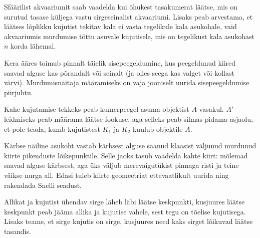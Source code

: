 \documentclass[10pt]{article}
\begin{document}
{
\hint
Sfäärilist akvaariumit saab vaadelda kui õhukest tasakumerat läätse, mis on surutud tasase küljega vastu sirgeseinalist akvaariumi. Lisaks peab arvestama, et läätses lõplikku kujutist tekitav kala ei vasta tegelikule kala asukohale, vaid akvaariumis murdumise tõttu asuvale kujutisele, mis on tegelikust kala asukohast $n$ korda lähemal.
\probend
\bigskip


\hint
Kera ääres toimub pinnalt täielik sisepeegeldumine, kus peegeldunud kiired saavad alguse kas põrandalt või seinalt (ja olles seega kas valget või kollast värvi). Murdumisnäitaja määramiseks on vaja jooniselt uurida sisepeegeldumise piirjuhtu.
\probend
\bigskip


\hint
Kahe kujutamise tekkeks peab kumerpeegel asuma objektist $A$ vasakul. $A'$ leidmiseks peab määrama läätse fookuse, aga selleks peab silmas pidama asjaolu, et pole teada, kumb kujutistest $K_1$ ja $K_2$ kuulub objektile $A$.
\probend
\bigskip


\hint
Kärbse näiline asukoht vastab kärbsest alguse saanud klaasist väljunud murdunud kiirte pikenduste lõikepunktile. Selle jaoks tasub vaadelda kahte kiirt: mõlemad saavad alguse kärbsest, aga üks väljub merevaigutükist pinnaga risti ja teine väikse nurga all. Edasi tuleb kiirte geomeetriat ettevaatlikult uurida ning rakendada Snelli seadust.
\probend
\bigskip


\hint
Allikat ja kujutist ühendav sirge läheb läbi läätse keskpunkti, kusjuures läätse keskpunkt peab jääma allika ja kujutise vahele, sest tegu on tõelise kujutisega. Lisaks teame, et sirge kujutis on sirge, kusjuures need kaks sirget lõikuvad läätse tasandis.
\probend
\bigskip


}
\end{document}
